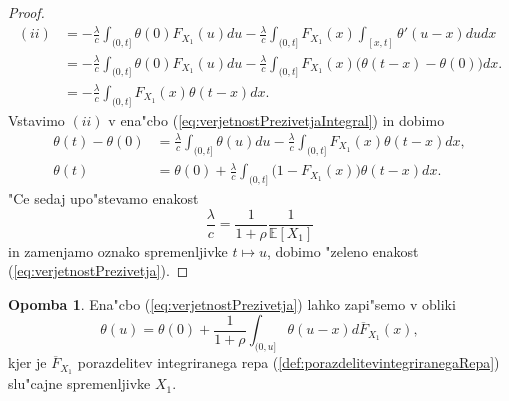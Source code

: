 \documentclass[12pt, a4paper, reqno]{amsart}
\theoremstyle{definition}
\newtheorem{opomba}[definicija]{Opomba}
\theoremstyle{plain}
\newcommand{\E}{\mathbb{E}}
\newcommand{\1}{\mathds{1}}
\begin{document}
\begin{proof}
                \begin{align*}
                    (ii)    &=  - \frac{\lambda}{c}\int_{(0, t]}\theta(0)F_{X_1}(u)du - \frac{\lambda}{c}\int_{(0, t]}F_{X_1}(x)\int_{[x, t]}\theta'(u - x)dudx \\
                            &= - \frac{\lambda}{c}\int_{(0, t]}\theta(0)F_{X_1}(u)du - \frac{\lambda}{c}\int_{(0, t]}F_{X_1}(x)\bigl(\theta(t-x) - \theta(0)\bigr)dx.\\
                            &= - \frac{\lambda}{c}\int_{(0, t]}F_{X_1}(x)\theta(t - x)dx.
                \end{align*}
                Vstavimo $(ii)$ v ena"cbo (\ref{eq:verjetnostPrezivetjaIntegral}) in dobimo
                \begin{align*}
                    \theta(t) - \theta(0) &= \frac{\lambda}{c}\int_{(0, t]}\theta(u)du - \frac{\lambda}{c}\int_{(0, t]}F_{X_1}(x)\theta(t - x)dx,\\
                    \theta(t) &= \theta(0) + \frac{\lambda}{c}\int_{(0, t]}\bigl(1 - F_{X_1}(x)\bigr)\theta(t - x)dx.
                \end{align*}
                "Ce sedaj upo"stevamo enakost 
                \begin{equation*}
                    \frac{\lambda}{c} = \frac{1}{1 + \rho}\frac{1}{\E\left[X_1\right]}
                \end{equation*}
                in zamenjamo oznako spremenljivke $t\mapsto u$, dobimo "zeleno enakost (\ref{eq:verjetnostPrezivetja}).

            \end{proof}

            \begin{opomba}
                    Ena"cbo (\ref{eq:verjetnostPrezivetja}) lahko zapi"semo v obliki 
                    \begin{equation}
                        \theta(u) = \theta(0) + \frac{1}{1+\rho}\int_{(0, u]}\theta(u - x)d\overline{F}_{X_1}(x),
                        \label{eq:verjetnostPrezivetja2}
                    \end{equation}
                    kjer je $\overline{F}_{X_1}$ porazdelitev integriranega repa (\ref{def:porazdelitevintegriranegaRepa}) 
                    slu"cajne spremenljivke $X_1$.
                \label{op:verjetnostPrezivetja1}
            \end{opomba}
\end{document}
